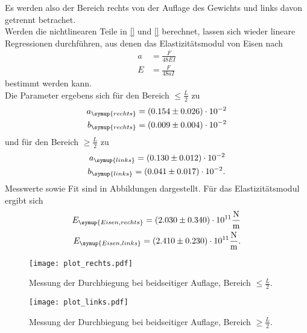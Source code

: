  \noindent Es werden also der Bereich rechts von der Auflage des Gewichts und links davon 
  getrennt betrachet.\\
  Werden die nichtlinearen Teile in \ref{} und \ref{} berechnet, lassen sich wieder lineare 
  Regressionen durchführen, aus denen das Elastizitätsmodul von Eisen nach 
  \begin{align*}
    a &= \frac{F}{48 E I} \\
    E &= \frac{F}{48 a I}
  \end{align*}
  bestimmt werden kann.\\
  Die Parameter ergebens sich für den Bereich $\leq \frac{L}{2}$ zu 
  \begin{align*}
    a_{\symup{rechts}} &= \left( 0.154 \pm 0.026 \right) \cdot 10^{-2}\\
    b_{\symup{rechts}} &= \left( 0.009 \pm 0.004 \right) \cdot 10^{-2}\\
  \end{align*}
  und für den Bereich $\geq \frac{L}{2}$ zu 
  \begin{align*}
    a_{\symup{links}} = \left( 0.130 \pm 0.012 \right) \cdot 10^{-2}\\
    b_{\symup{links}} = \left( 0.041 \pm 0.017 \right) \cdot 10^{-2}.\\
  \end{align*}
  Messwerte sowie Fit sind in Abbildungen dargestellt.
  Für das Elastizitätsmodul ergibt sich
  \begin{align*}
    E_{\symup{Eisen, rechts}} = \left( 2.030 \pm 0.340 \right) \cdot 10^{11} \si{\newton\per\m}\\
    E_{\symup{Eisen, links}} = \left( 2.410 \pm 0.230 \right) \cdot 10^{11} \si{\newton\per\m}.\\
  \end{align*}

  \begin{figure}
    \centering
    \texttt{[image: plot\_rechts.pdf]}
    \caption{Messung der Durchbiegung bei beidseitiger Auflage, Bereich $\leq \frac{L}{2}$.}
    \label{fig:rechts}
  \end{figure}

  \begin{figure}
    \centering
    \texttt{[image: plot\_links.pdf]}
    \caption{Messung der Durchbiegung bei beidseitiger Auflage, Bereich $\geq \frac{L}{2}$.}
    \label{fig:links}
  \end{figure}